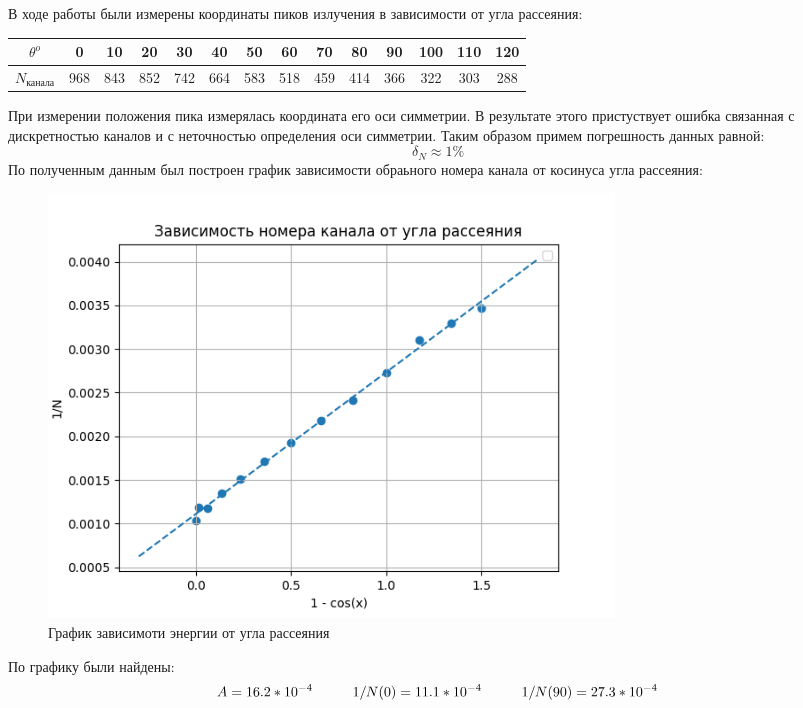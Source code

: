 \documentclass[a4paper,12pt]{article} %
\begin{document}
    В ходе работы были измерены координаты пиков излучения в зависимости от угла рассеяния:
    \begin{table}[h]
      \begin{tabular}{|c|c|c|c|c|c|c|c|c|c|c|c|c|c|}
      \hline
      $\theta^o$          & 0   & 10  & 20  & 30  & 40  & 50  & 60  & 70  & 80  & 90  & 100 & 110 & 120 \\ \hline
      $N_{\text{канала}}$              & 968 & 843 & 852 & 742 & 664 & 583 & 518 & 459 & 414 & 366 & 322 & 303 & 288 \\ \hline
      \end{tabular}
    \end{table}
    При измерении положения пика измерялась координата его оси симметрии.
    В результате этого пристуствует ошибка связанная с дискретностью каналов и с неточностью определения оси симметрии.
    Таким образом примем погрешность данных равной:
    \begin{equation}
      \delta_N \approx 1 \%      
    \end{equation} 
    По полученным данным был построен график зависимости обраьного номера канала от косинуса угла рассеяния:\par
    \begin{figure}[h!]
      \centering
      \includegraphics[width=15cm]{img/gra.png}
      \caption{График зависимоти энергии от угла рассеяния}
    \end{figure}\par
    По графику были найдены:
    \begin{equation}
      A = 16.2 * 10^{-4} \hspace{10mm}
      1/N(0) = 11.1 * 10^{-4} \hspace{10mm}
      1/N(90) = 27.3 * 10^{-4}
    \end{equation}
\end{document}
